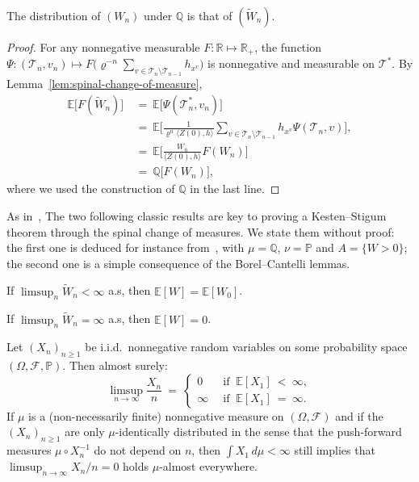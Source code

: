 \begin{refsegment}
\begin{cor}\label{cor:law-of-W-under-Q}
  The distribution of $(W_n)$ under $\mathbb{Q}$ is that of $(\widetilde{W}_n)$.
\end{cor}
\begin{proof}
For any nonnegative measurable $F:\mathbb{R}\mapsto \mathbb{R}_+$, the function $\Psi:(\mathcal{T}_n, v_n) \longmapsto F\big(\varrho^{-n}\sum_{v\in \mathcal{T}_n\setminus \mathcal{T}_{n-1}}h_{x^v}\big)$ is nonnegative and measurable on $\mathscr{T}^*$. By Lemma~\ref{lem:spinal-change-of-measure},
\begin{align*}
\mathbb{E}\big[F(\widetilde{W}_n)\big]\ &=\ \mathbb{E}\big[\Psi(\mathcal{T}^*_n, v_n)\big]\\
& =\ \mathbb{E}\bigg[\frac{1}{\varrho^n \langle Z(0),h\rangle}\sum_{v\in \mathcal{T}_{n}\setminus \mathcal{T}_{n-1}} h_{x^v}\Psi(\mathcal{T}_{ n},v)\bigg], \\
&=\  \mathbb{E}\Big[\frac{W_n}{\langle Z(0),h\rangle}  F(W_n)\Big]\\
&=\ \mathbb{Q}\big[F(W_n)\big], 
\end{align*}
where we used the construction of $\mathbb{Q}$ in the last line.
\end{proof}

As in~\citet{lyons_pemantle_peres_1995}, The two following classic results are key to proving a Kesten--Stigum theorem through the spinal change of measures.
We state them without proof: the first one is deduced for instance from~\citet[Theorem~5.3.3]{Dur10}, with $\mu=\mathbb{Q}$, $\nu=\mathbb{P}$ and $A=\{W>0\}$; the second one is a simple consequence of the Borel--Cantelli lemmas.

\begin{lem}\label{lem:dichotomy-tildeW}\hfill
  \begin{mathlist}
    \item If $\limsup_n \widetilde{W}_n < \infty$ a.s, then $\mathbb{E}[W]=\mathbb{E}[W_0]$.
    \item If $\limsup_n \widetilde{W}_n = \infty$ a.s, then $\mathbb{E}[W]=0$.
  \end{mathlist}
\end{lem}

\begin{lem}\label{lem:dichotomy-expectation}
  Let $(X_n)_{n\geq 1}$ be i.i.d.\ nonnegative random variables
  on some probability space $(\Omega, \mathcal{F}, \mathbb{P})$. Then almost surely:
  \[
    \limsup_{n\to\infty} \frac{X_n}{n}\ =\ \begin{cases}
      0 \quad & \text{if }\ \mathbb{E}[X_1]\ <\ \infty,\\
      \infty & \text{if }\ \mathbb{E}[X_1]\ =\ \infty.
    \end{cases}
  \]
  If $\mu$ is a (non-necessarily finite) nonnegative measure on
    $(\Omega, \mathcal{F})$ and if the $(X_n)_{n\geq 1}$ are only $\mu$-identically
    distributed in the sense that the push-forward measures
    $\mu\circ X_n^{-1}$ do not depend on $n$, then
    $\int X_1 \, d\mu <\infty$ still implies that
    $\limsup_{n\to\infty} X_n/n=0$ holds $\mu$-almost everywhere.
\end{lem}


\end{refsegment}
